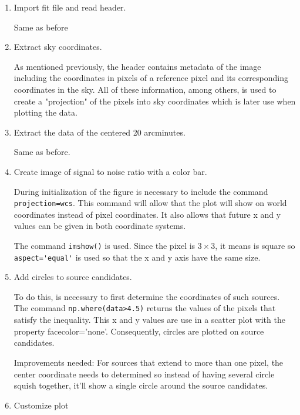 \begin{enumerate}
    \item Import fit file and read header.
    
    Same as before
    
    \item Extract sky coordinates.
    
    As mentioned previously, the header contains metadata of the image including the coordinates in pixels of a reference pixel and its corresponding coordinates in the sky. All of these information, among others, is used to create a "projection" of the pixels into sky coordinates which is later use when plotting the data.
    
    \item Extract the data of the centered 20 arcminutes.
    
    Same as before.
    
    \item Create image of signal to noise ratio with a color bar.
    
    During initialization of the figure is necessary to include the command \lstinline[columns=fixed, style=Python]{projection=wcs}. This command will allow that the plot will show on world coordinates instead of pixel coordinates. It also allows that future x and y values can be given in both coordinate systems. 
    
    The command \lstinline[columns=fixed, style=Python]{imshow()} is used. Since the pixel is $3 \times 3$, it means is square so \lstinline[columns=fixed, style=Python]{aspect='equal'} is used so that the x and y axis have the same size. 
    
    \item Add circles to source candidates.
    
    To do this, is necessary to first determine the coordinates of such sources. The command \lstinline[columns=fixed, style=Python]{np.where(data>4.5)} returns the values of the pixels that satisfy the inequality. This x and y values are use in a scatter plot with the property facecolor='none'. Consequently, circles are plotted on source candidates. 
    
    Improvements needed: For sources that extend to more than one pixel, the center coordinate needs to determined so instead of having several circle squish together, it'll show a single circle around the source candidates. 
    
    \item Customize plot
    
\end{enumerate}

